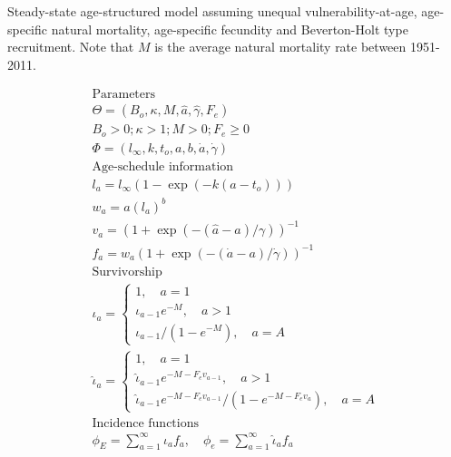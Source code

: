 \begin{table}[!tbp]
\caption{Steady-state age-structured model assuming unequal
vulnerability-at-age, age-specific natural mortality, age-specific
fecundity and Beverton-Holt type recruitment.  Note that $M$ is the average natural mortality rate between 1951-2011.}\label{Table2} 
\tableEq
    \begin{gather}
           \hline
        \mbox{Parameters} \nonumber \\
            \Theta = (B_o,\kappa,M,\hat{a},\hat{\gamma},F_e) \label{T2.1}\\
            B_o>0; \kappa > 1; M > 0; F_e \ge 0 \nonumber\\
            \Phi = (l_\infty, k, t_o,a,b,\dot{a},\dot{\gamma}) \label{T2.3}\\[1ex]
        \mbox{Age-schedule information} \nonumber\\
            l_a=l_\infty(1-\exp(-k(a-t_o)))\label{T2.4}\\
            w_a=a(l_a)^b \label{T2.5}\\
            v_a=(1+\exp(-(\hat{a}-a)/\gamma))^{-1} \label{T2.6}\\
            f_a=w_a(1+\exp(-(\dot{a}-a)/\dot{\gamma}))^{-1} \label{T2.7}\\[1ex]
        \mbox{Survivorship} \nonumber\\
            \iota_a=\begin{cases} 1, \quad a=1      \label{T2.8} \\
            \iota_{a-1}e^{-M},\quad a>1\\
            \iota_{a-1}/(1-e^{-M}),\quad a=A \end{cases}\\
            \hat{\iota}_a=\begin{cases} 1, \quad a=1\\
            \hat{\iota}_{a-1}e^{-M-F_e v_{a-1}},\quad a>1\\
            \hat{\iota}_{a-1}e^{-M-F_e v_{a-1}}/(1-e^{-M-F_e v_{a}}),\quad a=A
            \end{cases} \label{T2.9}\\[1ex]
        \mbox{Incidence functions} \nonumber \\
            \phi_E=\sum_{a=1}^\infty \iota_a f_a, \quad
            \phi_e=\sum_{a=1}^\infty \hat{\iota}_a f_a \label{T2.10}\\

\end{gather}
\end{table}
